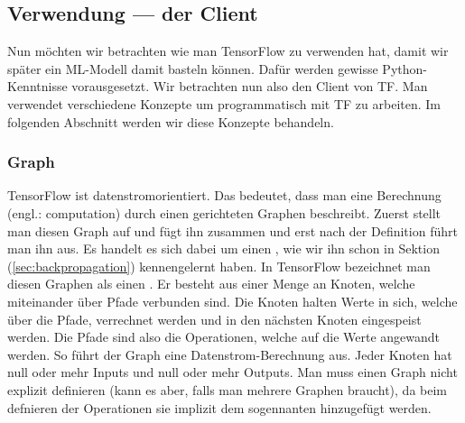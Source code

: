 \subsection{Verwendung --- der Client}
Nun möchten wir betrachten wie man TensorFlow zu verwenden hat, damit wir
später ein ML-Modell damit basteln können. Dafür werden gewisse
Python-Kenntnisse vorausgesetzt. Wir betrachten nun also
den Client von TF. Man verwendet verschiedene Konzepte um
programmatisch mit TF zu arbeiten. Im folgenden Abschnitt werden wir diese
Konzepte behandeln.

\subsubsection{Graph}
TensorFlow ist datenstromorientiert. Das bedeutet, dass man eine Berechnung
(engl.: computation) durch einen gerichteten Graphen beschreibt. Zuerst stellt
man diesen Graph auf und fügt ihn zusammen und erst nach der Definition führt man
ihn aus.
Es handelt es sich dabei um einen , wie wir ihn schon in Sektion (\ref{sec:backpropagation}) kennengelernt
haben. In TensorFlow bezeichnet man diesen Graphen als einen .
\para{}
Er besteht aus einer Menge an Knoten, welche miteinander über Pfade
verbunden sind. Die Knoten halten Werte in sich, welche über die Pfade,
verrechnet werden und in den nächsten Knoten eingespeist werden. Die Pfade sind also die Operationen, welche auf die Werte
angewandt werden. So führt der Graph eine Datenstrom-Berechnung aus.
Jeder Knoten hat null oder mehr Inputs und null oder mehr Outputs.
\para{}
Man muss einen Graph nicht explizit definieren (kann es aber, falls man mehrere
Graphen braucht), da beim defnieren der Operationen sie implizit dem
sogennanten  hinzugefügt werden.


